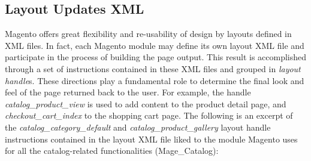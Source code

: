 \subsection{Layout Updates XML}

Magento offers great flexibility and re-usability of design by layouts defined in XML files. In fact, each Magento module may define its own layout XML file and participate in the process of building the page output. This result is accomplished through a set of instructions contained in these XML files and grouped in \textit{layout handle}s. These directions play a fundamental role to determine the final look and feel of the page returned back to the user.
For example, the handle \textit{catalog\_product\_view} is used to add content to the product detail page, and \textit{checkout\_cart\_index} to the shopping cart page. The following is an excerpt of the \textit{catalog\_category\_default} and  \textit{catalog\_product\_gallery} layout handle instructions contained in the layout XML file liked to the module Magento uses for all the catalog-related functionalities (Mage\_Catalog):

